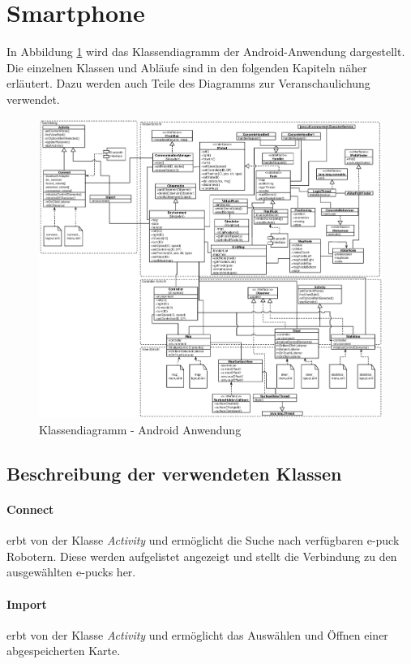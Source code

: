 \documentclass[10pt,a4paper]{article}
\begin{document}
		\section{Smartphone}
			In Abbildung \ref{fig:klassendiagramm} wird das Klassendiagramm der Android-Anwendung dargestellt. Die einzelnen Klassen und Abläufe
			sind in den folgenden Kapiteln näher erläutert. Dazu werden auch Teile des Diagramms zur Veranschaulichung verwendet. \\
			\begin{figure}[p]
				\centering
				\includegraphics[width=18cm, angle=90]{images/android_klassendiagramm.eps}
  				\caption{Klassendiagramm - Android Anwendung}
  				\label{fig:klassendiagramm}
  			\end{figure}	

			\subsection{Beschreibung der verwendeten Klassen}
			\paragraph*{\textbf{Connect}} erbt von der Klasse \textit{Activity} und ermöglicht die Suche nach verfügbaren e-puck Robotern. Diese werden
			aufgelistet angezeigt und stellt die Verbindung zu den ausgewählten e-pucks her.
			\paragraph*{\textbf{Import}} erbt von der Klasse \textit{Activity} und ermöglicht das Auswählen und Öffnen einer abgespeicherten Karte.
\end{document}
